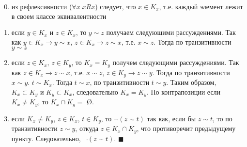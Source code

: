 \begin{enumerate}
\setcounter{enumi}{-1}
    \item из рефлексивности ($\forall x \; xRx$) следует, что $x \in K_x$, т.е. каждый элемент лежит в своем классе эквивалентности
    \item если $y \in K_x$ и $z \in K_x$, то $y \sim z$ получаем следующими рассуждениями. Так как $y \in K_x \rightarrow y \sim x$, $z \in K_x \rightarrow z \sim x$, т.е. $x \sim z$. Тогда по транзитивности $y \sim z$
    \item если $z \in K_x$, $z \in K_y$, то $ K_x = K_y$ получем следующими рассуждениями. Так как $z \in K_x \rightarrow z \sim x$, т.е. $x \sim z$, $z \in K_y \rightarrow z \sim y$. Тогда по транзитивности $x \sim y$.  $t \sim K_x$. Тогда $t \sim x$, по транзитивности $t \sim y$. Таким образом, $K_x \subset K_y$ и $K_y \subset K_x$, следовательно $K_x=K_y$. По контрапозиции если $K_x \neq K_y$, то $K_x \cap K_y = $ \O.
    \item если $K_x \neq K_y$, $z \in K_x$, $t \in K_y$, то $\neg(z \sim t)$ так как, если бы $z \sim t$, то по транзитивности $z \sim y$, откуда $z \in K_x \cap K_y$, что противоречит предыдущему пункту. Следовательно, $\neg(z \sim t)$. $\blacksquare$
\end{enumerate}

